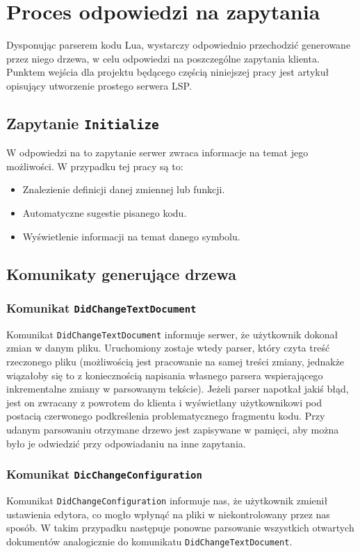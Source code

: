 \chapter{Proces odpowiedzi na zapytania}
Dysponując parserem kodu Lua, wystarczy odpowiednio przechodzić generowane przez niego drzewa, w celu odpowiedzi na poszczególne zapytania klienta. Punktem wejścia dla projektu będącego częścią niniejszej pracy jest artykuł \cite{lsp_sample} opisujący utworzenie prostego serwera LSP.

\section{Zapytanie \texttt{Initialize}}
W odpowiedzi na to zapytanie serwer zwraca informacje na temat jego możliwości. W przypadku tej pracy są to:

\begin{itemize}
    \item Znalezienie definicji danej zmiennej lub funkcji.
    \item Automatyczne sugestie pisanego kodu.
    \item Wyświetlenie informacji na temat danego symbolu.
\end{itemize}

\section{Komunikaty generujące drzewa}
\subsection{Komunikat \texttt{DidChangeTextDocument}}
Komunikat \texttt{DidChangeTextDocument} informuje serwer, że użytkownik dokonał zmian w danym pliku. Uruchomiony zostaje wtedy parser, który czyta treść rzeczonego pliku (możliwością jest pracowanie na samej treści zmiany, jednakże wiązałoby się to z koniecznością napisania własnego parsera wspierającego inkrementalne zmiany w parsowanym tekście). Jeżeli parser napotkał jakiś błąd, jest on zwracany z powrotem do klienta i wyświetlany użytkownikowi pod postacią czerwonego podkreślenia problematycznego fragmentu kodu. Przy udanym parsowaniu otrzymane drzewo jest zapisywane w pamięci, aby można było je odwiedzić przy odpowiadaniu na inne zapytania.

\subsection{Komunikat \texttt{DicChangeConfiguration}}
Komunikat \texttt{DidChangeConfiguration} informuje nas, że użytkownik zmienił ustawienia edytora, co mogło wpłynąć na pliki w niekontrolowany przez nas sposób. W takim przypadku następuje ponowne parsowanie wszystkich otwartych dokumentów analogicznie do komunikatu \texttt{DidChangeTextDocument}.

